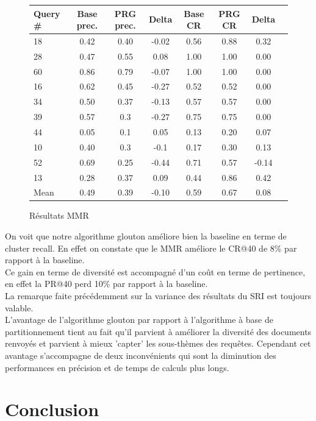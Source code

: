 \documentclass{article}
\begin{document}
\begin{figure}[H]
\begin{tabular}{l*{6}{c}r}
Query \# & Base prec. & PRG prec. & Delta  & Base CR & PRG CR & Delta\\ 
\hline
   18 &    0.42   &   0.40   &   -0.02 &  0.56  & 0.88  &    0.32 \\
   28 &    0.47   &   0.55   &    0.08 &  1.00  & 1.00  &    0.00 \\
   60 &    0.86   &   0.79   &   -0.07 &  1.00  & 1.00  &    0.00 \\
   16 &    0.62   &   0.45   &   -0.27 &  0.52  & 0.52  &    0.00 \\
   34 &    0.50   &   0.37   &   -0.13 &  0.57  & 0.57  &    0.00 \\
   39 &    0.57   &   0.3   &    -0.27 &  0.75  & 0.75  &    0.00 \\
   44 &    0.05   &   0.1   &     0.05 &  0.13  & 0.20  &    0.07 \\
   10 &    0.40   &   0.3   &    -0.1 &  0.17  & 0.30  &     0.13 \\
   52 &    0.69   &   0.25   &   -0.44 &  0.71  & 0.57  &   -0.14 \\
   13 &    0.28   &   0.37   &    0.09 &  0.44  & 0.86  &    0.42 \\
\hline
Mean  &    0.49   &   0.39   &   -0.10 &  0.59  & 0.67  &   0.08 \\
\end{tabular}
\caption{Résultats MMR}
\end{figure}

On voit que notre algorithme glouton améliore bien la baseline en terme de cluster recall. En effet on constate que le MMR améliore le CR@40 de 8\% par rapport à la baseline.\\
Ce gain en terme de diversité est accompagné d'un coût en terme de pertinence, en effet la PR@40 perd 10\% par rapport à la baseline. \\
La remarque faite précédemment sur la variance des résultats du SRI est toujours valable.\\

L'avantage de l'algorithme glouton par rapport à l'algorithme à base de partitionnement tient au fait qu'il parvient à améliorer la diversité des documents renvoyés et parvient à mieux 'capter' les sous-thèmes des requêtes. 
Cependant cet avantage s'accompagne de deux inconvénients qui sont la diminution des performances en précision et de temps de calculs plus longs.
\section{Conclusion}
\end{document}
